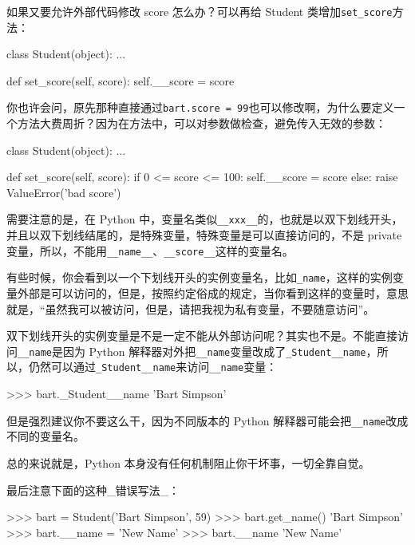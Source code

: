 如果又要允许外部代码修改 score 怎么办？可以再给 Student
类增加\texttt{set\_score}方法：

\begin{pythoncode}
class Student(object):
    ...

    def set_score(self, score):
        self.__score = score
\end{pythoncode}

你也许会问，原先那种直接通过\texttt{bart.score\ =\ 99}也可以修改啊，为什么要定义一个方法大费周折？因为在方法中，可以对参数做检查，避免传入无效的参数：

\begin{pythoncode}
class Student(object):
    ...

    def set_score(self, score):
        if 0 <= score <= 100:
            self.__score = score
        else:
            raise ValueError('bad score')
\end{pythoncode}

需要注意的是，在 Python
中，变量名类似\texttt{\_\_xxx\_\_}的，也就是以双下划线开头，并且以双下划线结尾的，是特殊变量，特殊变量是可以直接访问的，不是
private
变量，所以，不能用\texttt{\_\_name\_\_}、\texttt{\_\_score\_\_}这样的变量名。

有些时候，你会看到以一个下划线开头的实例变量名，比如\texttt{\_name}，这样的实例变量外部是可以访问的，但是，按照约定俗成的规定，当你看到这样的变量时，意思就是，``虽然我可以被访问，但是，请把我视为私有变量，不要随意访问''。

双下划线开头的实例变量是不是一定不能从外部访问呢？其实也不是。不能直接访问\texttt{\_\_name}是因为
Python
解释器对外把\texttt{\_\_name}变量改成了\texttt{\_Student\_\_name}，所以，仍然可以通过\texttt{\_Student\_\_name}来访问\texttt{\_\_name}变量：

\begin{pythoncode}
>>> bart._Student__name
'Bart Simpson'
\end{pythoncode}

但是强烈建议你不要这么干，因为不同版本的 Python
解释器可能会把\texttt{\_\_name}改成不同的变量名。

总的来说就是，Python 本身没有任何机制阻止你干坏事，一切全靠自觉。

最后注意下面的这种\_错误写法\_：

\begin{pythoncode}
>>> bart = Student('Bart Simpson', 59)
>>> bart.get_name()
'Bart Simpson'
>>> bart.__name = 'New Name' 
>>> bart.__name
'New Name'
\end{pythoncode}

